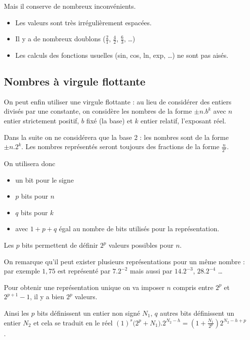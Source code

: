 Mais il conserve de nombreux inconvénients.

\begin{itemize}
    \item Les valeurs sont très irrégulièrement espacées.
    \item Il y a de nombreux doublons ($\frac 21$, $\frac 42$, $\frac 63$, \dots)
    \item Les calculs des fonctions usuelles (sin, cos, ln, exp, \dots) ne sont pas aisés.
  \end{itemize}
\subsection{Nombres à virgule flottante}
On peut enfin utiliser une virgule flottante : au lieu de considérer des entiers divisés par une constante, on considère les nombres de la forme $\pm n.b^k$ avec $n$ entier strictement positif, $b$ fixé (la base) et $k$ entier relatif, l'exposant réel.

Dans la suite on ne considérera que la base 2 : les nombres sont de la forme $\pm n.2^k$. Les nombres représentés seront toujours des fractions de la forme $\frac{n}{2^s}$.

On utilisera donc
\begin{itemize}
    \item un bit pour le signe
    \item $p$ bits pour $n$
    \item $q$ bits pour $k$
    \item avec $1+p+q$ égal au nombre de bits utilisés pour la représentation.
\end{itemize}

Les $p$ bits permettent de définir $2^p$ valeurs possibles pour $n$.

On remarque qu'il peut exister plusieurs représentations pour un même nombre : par exemple $1,75$ est représenté par $7.2^{-2}$ mais aussi par $14.2^{-3}$, $28.2^{-4}$ \dots

Pour obtenir une représentation unique on va imposer $n$ compris entre $2^p$ et $2^{p+1}-1$, il y a bien $2^p$ valeurs.

Ainsi les $p$ bits définissent un entier non signé $N_1$, $q$ autres bits définissent un entier $N_2$ et cela se traduit en le réel $\displaystyle (1)^s \bigl(2^p+N_1\bigr).2^{N_2-h}
=\left(1+\frac{N_1}{2^p}\right)2^{N_2-h+p}$.

